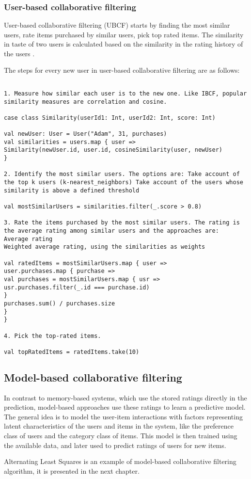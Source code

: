 \documentclass[main.tex]{thesis.tex}
\begin{document}
\subsubsection{User-based collaborative filtering}

User-based collaborative filtering (UBCF) starts by finding the most similar users, rate items purchased by similar users, pick top rated items.
The similarity in taste of two users is calculated based on the similarity in the rating history of the users \cite{ricci11}.

The steps for every new user in user-based collaborative filtering are as follows:

\lstset{
	columns=flexible,
	frame=single,
	breaklines=true
}

\begin{lstlisting}[caption=User-Based Collaborative Filtering algorithm \cite{gorakala15}]

1. Measure how similar each user is to the new one. Like IBCF, popular similarity measures are correlation and cosine.

case class Similarity(userId1: Int, userId2: Int, score: Int)

val newUser: User = User("Adam", 31, purchases)
val similarities = users.map { user =>
Similarity(newUser.id, user.id, cosineSimilarity(user, newUser)
}

2. Identify the most similar users. The options are: Take account of the top k users (k-nearest_neighbors) Take account of the users whose similarity is above a defined threshold

val mostSimilarUsers = similarities.filter(_.score > 0.8)

3. Rate the items purchased by the most similar users. The rating is the average rating among similar users and the approaches are:
Average rating
Weighted average rating, using the similarities as weights

val ratedItems = mostSimilarUsers.map { user =>
user.purchases.map { purchase =>
val purchases = mostSimilarUsers.map { usr =>
usr.purchases.filter(_.id === purchase.id)
}
purchases.sum() / purchases.size
}
}

4. Pick the top-rated items.

val topRatedItems = ratedItems.take(10)
\end{lstlisting}

\subsection{Model-based collaborative filtering}

In contrast to memory-based systems, which use the stored ratings directly in the prediction, model-based approaches use these ratings to learn a predictive model.
The general idea is to model the user-item interactions with factors representing latent characteristics of the users and items in the system, like the preference class of users and the category class of items.
This model is then trained using the available data, and later used to predict ratings of users for new items. \cite{ricci11}

Alternating Least Squares is an example of model-based collaborative filtering algorithm, it is presented in the next chapter.
\end{document}
